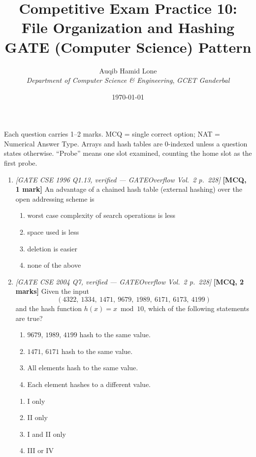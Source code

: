 \documentclass[11pt]{article}
\title{Competitive Exam Practice 10: File Organization and Hashing\\\large GATE (Computer Science) Pattern}
\author{Auqib Hamid Lone\\[0.3em]
  \emph{Department of Computer Science \& Engineering}, \emph{GCET Ganderbal}}
\date{\today}
\begin{document}
\maketitle

\noindent Each question carries 1--2 marks. MCQ = single correct option; NAT = Numerical Answer Type. Arrays and hash tables are 0-indexed unless a question states otherwise. ``Probe'' means one slot examined, counting the home slot as the first probe.

\begin{enumerate}
\item[\textbf{Q1}] \textit{[GATE CSE 1996 Q1.13, verified --- GATEOverflow Vol.~2 p.~228]} \textbf{[MCQ, 1 mark]} An advantage of a chained hash table (external hashing) over the open addressing scheme is
\begin{enumerate}
  \item[(A)] worst case complexity of search operations is less
  \item[(B)] space used is less
  \item[(C)] deletion is easier
  \item[(D)] none of the above
\end{enumerate}

\item[\textbf{Q2}] \textit{[GATE CSE 2004 Q7, verified --- GATEOverflow Vol.~2 p.~228]} \textbf{[MCQ, 2 marks]} Given the input
\[
(4322,\ 1334,\ 1471,\ 9679,\ 1989,\ 6171,\ 6173,\ 4199)
\]
and the hash function $h(x)=x \bmod 10$, which of the following statements are true?
\begin{enumerate}
  \item[I.] $9679$, $1989$, $4199$ hash to the same value.
  \item[II.] $1471$, $6171$ hash to the same value.
  \item[III.] All elements hash to the same value.
  \item[IV.] Each element hashes to a different value.
\end{enumerate}
\begin{enumerate}
  \item[(A)] I only
  \item[(B)] II only
  \item[(C)] I and II only
  \item[(D)] III or IV
\end{enumerate}


\end{enumerate}
\end{document}

